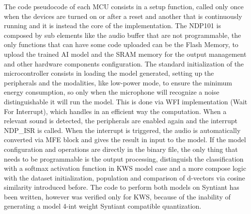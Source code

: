 The code pseudocode of each MCU consists in a setup function, called only once when the devices are turned on or after a reset and another that is continuously running and it is instead the core of the implementation.
The NDP101 is composed by sub elements like the audio buffer that are not programmable, the only functions that can have some code uploaded can be the Flash Memory, to upload the trained AI model and the SRAM memory for the output management and other hardware components configuration.
The standard initialization of the microcontroller consists in loading the model generated, setting up the peripherals and the modalities, like low-power mode, to ensure the minimum energy consumption, so only when the microphone will recognize a noise distinguishable it will run the model. This is done via WFI implementation (Wait For Interrupt), which handles in an efficient way the computation. When a relevant sound is detected, the peripherals are enabled again and the interrupt NDP\_ISR is called. When the interrupt is triggered, the audio is automatically converted via MFE block and gives the result in input to the model. If the model configuration and operations are directly in the binary file, the only thing that needs to be programmable is the output processing, distinguish the classification with a softmax activation function in KWS model case and a more compose logic with the dataset initialization, population and comparison of d-vectors via cosine similarity introduced before. The code to perform both models on Syntiant has been written, however was verified only for KWS, because of the inability of generating a model 4-int weight Syntiant compatible quantization.

    
%
        
